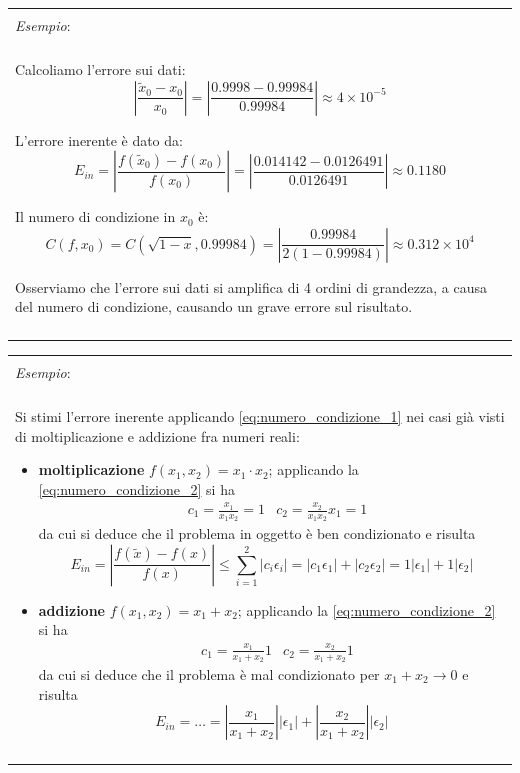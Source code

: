 \documentclass{article}
\numberwithin{equation}{section}
\newenvironment{example}
{\begin{center}
        \begin{tabular}{|p{0.9\textwidth}|}
            \hline \\ 
            \textit{Esempio}: \\\\ 
        }
        {
            \\\\ \hline
        \end{tabular}
    \end{center}
}
\begin{document}
\begin{example}
Calcoliamo l'errore sui dati:
$$\left\lvert\frac{\tilde{x}_0 - x_0}{x_0}\right\rvert =
\left\lvert\frac{0.9998 - 0.99984}{0.99984}\right\rvert \approx 4 \times 10^{-5}$$

L'errore inerente è dato da:
$$E_{in}=\left\lvert
\frac{f(\tilde{x}_0)-f(x_0)}{f(x_0)}\right\rvert=\left\lvert
\frac{0.014142-0.0126491}{0.0126491}\right\rvert\approx 0.1180$$

Il numero di condizione in $x_0$ è:
$$C(f, x_0) = C(\sqrt{1-x}, 0.99984) =
\left\lvert\frac{0.99984}{2(1-0.99984)}\right\rvert \approx 0.312 \times 10^4$$

Osserviamo che l'errore sui dati si amplifica di 4 ordini di grandezza, a causa
del numero di condizione, causando un grave errore sul risultato.
\end{example}
\begin{example}
    Si stimi l'errore inerente applicando \ref{eq:numero_condizione_1} nei casi già visti
   di moltiplicazione e addizione fra numeri reali:
   \begin{itemize}
       \item \textbf{moltiplicazione} $f(x_1,x_2)=x_1\cdot x_2$; applicando
           la \ref{eq:numero_condizione_2} si ha
           \begin{equation*}
                \begin{aligned}
                    & c_1=\frac{x_1}{x_1x_2}=1 & c_2=\frac{x_2}{x_1x_2}x_1=1
                \end{aligned} 
           \end{equation*}
           da cui si deduce che il problema in oggetto è ben condizionato e
           risulta 
           $$E_{in}=\left\lvert
           \frac{f(\tilde{x})-f(x)}{f(x)}\right\rvert\leq
           \displaystyle\sum_{i=1}^{2}\left\lvert
           c_i\epsilon_i\right\rvert=\left\lvert
           c_1\epsilon_1\right\rvert+\left\lvert
           c_2\epsilon_2\right\rvert=1 \left\lvert \epsilon_1\right\rvert+1
           \left\lvert \epsilon_2\right\rvert$$
       \item \textbf{addizione} $f(x_1,x_2)=x_1+x_2$; applicando la
           \ref{eq:numero_condizione_2} si ha
           \begin{equation*}
                \begin{aligned}
                    & c_1=\frac{x_1}{x_1+x_2}1 & c_2=\frac{x_2}{x_1+x_2}1
                \end{aligned} 
           \end{equation*}
           da cui si deduce che il problema è mal condizionato per
           $x_1+x_2\rightarrow0$ e risulta 
           $$E_{in}=\ldots=\left\lvert \frac{x_1}{x_1+x_2}\right\rvert
           \left\lvert \epsilon_1\right\rvert+ \left\lvert
           \frac{x_2}{x_1+x_2}\right\rvert \left\lvert \epsilon_2\right\rvert$$
   \end{itemize}
\end{example}
\end{document}
